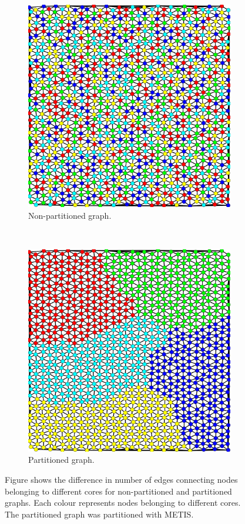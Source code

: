 \begin{figure}[H]
\centering
\begin{subfigure}[b]{0.48\textwidth}
\includegraphics[width=\textwidth]{img/partitioning_false.png}
\caption{Non-partitioned graph.}
\end{subfigure}
~
\begin{subfigure}[b]{0.48\textwidth}
\includegraphics[width=\textwidth]{img/partitioning_true.png}
\caption{Partitioned graph.}
\end{subfigure}
\caption{Figure shows the difference in number of edges connecting nodes belonging to different cores for non-partitioned and partitioned graphs. Each colour represents nodes belonging to different cores. The partitioned graph was partitioned with METIS.}
\label{fig:partitioning}
\end{figure}
